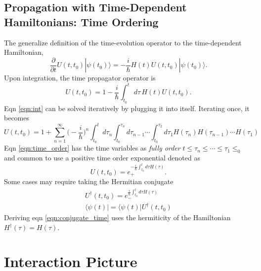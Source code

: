 \documentclass{article}
\begin{document}
\subsection{Propagation with Time-Dependent Hamiltonians: Time Ordering}

The generalize definition of the time-evolution operator to the time-dependent
Hamiltonian,
\begin{equation}
  \frac{\partial}{\partial t} U(t,t_0)|\psi(t_0)\rangle
  = - \frac{i}{\hbar}H(t)U(t,t_0)|\psi(t_0)\rangle.
  \label{eqn:time_int}
\end{equation}
Upon integration, the time propagator operator is
\begin{equation}
  U(t,t_0) = 1 - \frac{i}{\hbar}\int^t_{t_0}\,d\tau\,H(t)U(t,t_0).
  \label{eqn:int}
\end{equation}
Eqn \eqref{eqn:int} can be solved iteratively by plugging it into itself.
Iterating once, it becomes
\begin{equation}
  U(t,t_0) = 1 + \sum^{\infty}_{n=1}\Bigg(-\frac{i}{\hbar}\Bigg)^n
  \int^t_{t_0}d\tau_n\int^{\tau_n}_{t_0}d\tau_{n-1}\cdots\int^{\tau_2}_{t_0}
  d\tau_1H(\tau_n)H(\tau_{n-1})\cdots H(\tau_1)
  \label{eqn:time_order}
\end{equation}
Eqn \eqref{eqn:time_order} has the time variables as \textit{fully order}
$t\leq\tau_n\leq\cdots\leq\tau_1\leq_0$ and common to use a positive time
order exponential denoted as
\begin{equation}
  U(t,t_0) = e_+^{-\frac{i}{\hbar}\int^t_{t_0}d\tau H(\tau)}.
  \label{eqn:pos_time}
\end{equation}
Some cases may require taking the Hermitian conjugate
\begin{align}
  U^{\dagger}(t,t_0) = e_-^{\frac{i}{\hbar}\int^t_{t_0}d\tau H(\tau)}
  \label{eqn:conjugate_time}\\
  \langle\psi(t)| = \langle\psi(t)|U^{\dagger}(t,t_0)
\end{align}
Deriving eqn \eqref{eqn:conjugate_time} uses the hermiticity of the Hamiltonian
$H^{\dagger}(\tau)=H(\tau)$.

\section{Interaction Picture}
\end{document}
